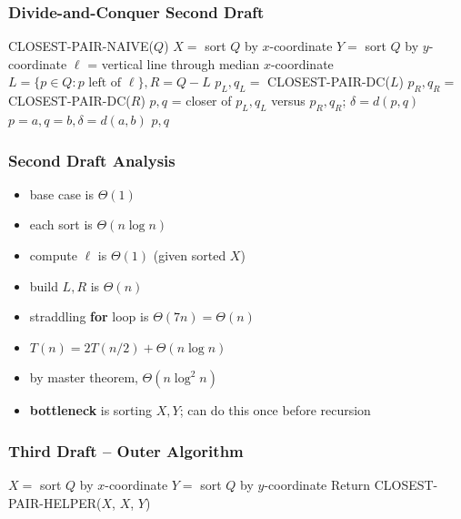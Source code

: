 \documentclass{beamer}
\begin{document}
\begin{frame} \frametitle{Divide-and-Conquer Second Draft}
  {\footnotesize
\begin{algorithmic}[1]
      \State \Return CLOSEST-PAIR-NAIVE($Q$)
    \Else
      \State $X = $ sort $Q$ by $x$-coordinate
      \State $Y = $ sort $Q$ by $y$-coordinate
      \State $\ell$ = vertical line through median $x$-coordinate
      \State $L = \{p \in Q : p \text{ left of } \ell\}, R = Q-L$
      \State $p_L, q_L = $ CLOSEST-PAIR-DC($L$)
      \State $p_R, q_R = $ CLOSEST-PAIR-DC($R$)
      \State $p, q$ = closer of $p_L, q_L$ versus $p_R, q_R$; $\delta=d(p,q)$
            \State $p=a, q=b, \delta=d(a,b)$
          \EndIf
        \EndFor
      \EndFor
      \State \Return $p, q$
    \EndIf
  \EndFunction
\end{algorithmic}
}
\end{frame}

\begin{frame} \frametitle{Second Draft Analysis}
\begin{itemize}
  \item base case is $\Theta(1)$
  \item each sort is $\Theta(n \log n)$
  \item compute $\ell$ is $\Theta(1)$ (given sorted $X$)
  \item build $L, R$ is $\Theta(n)$
  \item straddling \textbf{for} loop is $\Theta(7n) = \Theta(n)$
  \item $T(n) = 2 T(n/2) + \Theta(n \log n)$
  \item by master theorem, $\Theta(n \log^2 n)$
  \item \textbf{bottleneck} is sorting $X, Y$; can do this once before recursion
\end{itemize}
\end{frame}

\begin{frame} \frametitle{Third Draft -- Outer Algorithm}
\begin{algorithmic}[1]
    \State $X = $ sort $Q$ by $x$-coordinate
    \State $Y = $ sort $Q$ by $y$-coordinate
    \State Return CLOSEST-PAIR-HELPER($X$, $X$, $Y$)
  \EndFunction
\end{algorithmic}
\end{frame}
\end{document}

